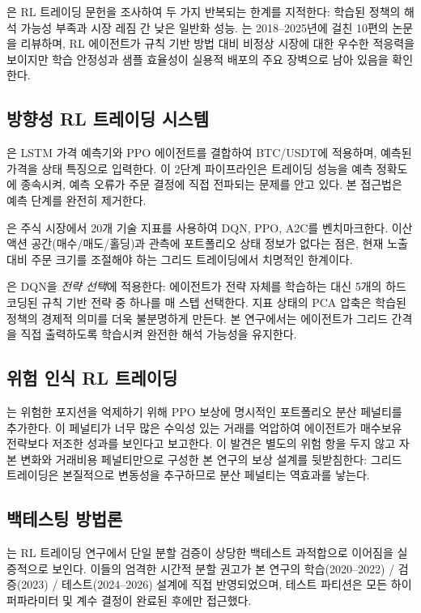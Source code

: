 \documentclass[11pt, a4paper]{article}
\begin{document}
\citet{sun2023rl}은 RL 트레이딩 문헌을 조사하여 두 가지 반복되는 한계를 지적한다:
학습된 정책의 해석 가능성 부족과 시장 레짐 간 낮은 일반화 성능.
\citet{liu2025review}는 2018--2025년에 걸친 10편의 논문을 리뷰하며,
RL 에이전트가 규칙 기반 방법 대비 비정상 시장에 대한 우수한 적응력을 보이지만
학습 안정성과 샘플 효율성이 실용적 배포의 주요 장벽으로 남아 있음을 확인한다.

\subsection{방향성 RL 트레이딩 시스템}

\citet{liu2021bitcoin}은 LSTM 가격 예측기와 PPO 에이전트를 결합하여 BTC/USDT에 적용하며,
예측된 가격을 상태 특징으로 입력한다.
이 2단계 파이프라인은 트레이딩 성능을 예측 정확도에 종속시켜,
예측 오류가 주문 결정에 직접 전파되는 문제를 안고 있다.
본 접근법은 예측 단계를 완전히 제거한다.

\citet{yasin2024rl}은 주식 시장에서 20개 기술 지표를 사용하여 DQN, PPO, A2C를
벤치마크한다.
이산 액션 공간(매수/매도/홀딩)과 관측에 포트폴리오 상태 정보가 없다는 점은,
현재 노출 대비 주문 크기를 조절해야 하는 그리드 트레이딩에서 치명적인 한계이다.

\citet{pham2025dqn}은 DQN을 \emph{전략 선택}에 적용한다: 에이전트가 전략 자체를
학습하는 대신 5개의 하드코딩된 규칙 기반 전략 중 하나를 매 스텝 선택한다.
지표 상태의 PCA 압축은 학습된 정책의 경제적 의미를 더욱 불분명하게 만든다.
본 연구에서는 에이전트가 그리드 간격을 직접 출력하도록 학습시켜 완전한
해석 가능성을 유지한다.

\subsection{위험 인식 RL 트레이딩}

\citet{bandarupalli2025risk}는 위험한 포지션을 억제하기 위해 PPO 보상에
명시적인 포트폴리오 분산 페널티를 추가한다.
이 페널티가 너무 많은 수익성 있는 거래를 억압하여 에이전트가 매수보유 전략보다
저조한 성과를 보인다고 보고한다.
이 발견은 별도의 위험 항을 두지 않고 자본 변화와 거래비용 페널티만으로 구성한
본 연구의 보상 설계를 뒷받침한다: 그리드 트레이딩은 본질적으로 변동성을 추구하므로
분산 페널티는 역효과를 낳는다.

\subsection{백테스팅 방법론}

\citet{gort2022backtest}는 RL 트레이딩 연구에서 단일 분할 검증이 상당한
백테스트 과적합으로 이어짐을 실증적으로 보인다.
이들의 엄격한 시간적 분할 권고가 본 연구의
학습(2020--2022) / 검증(2023) / 테스트(2024--2026) 설계에 직접 반영되었으며,
테스트 파티션은 모든 하이퍼파라미터 및 계수 결정이 완료된 후에만 접근했다.
\end{document}

